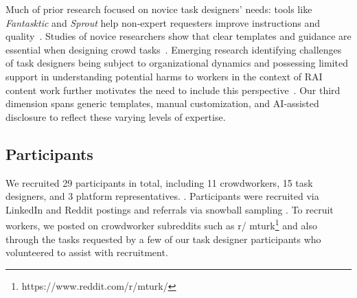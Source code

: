 Much of prior research focused on novice task designers’ needs: tools like \emph{Fantasktic} and \emph{Sprout} help non‑expert requesters improve instructions and quality~\cite{gutheim2012fantasktic,bragg2018sprout}. Studies of novice researchers show that clear templates and guidance are essential when designing crowd tasks~\cite{papoutsaki2015crowdsourcing}. Emerging research identifying challenges of task designers being subject to organizational dynamics and possessing limited support in understanding potential harms to workers in the context of RAI content work further motivates the need to include this perspective~\cite{qian2025locating}. Our third dimension spans generic templates, manual customization, and AI‑assisted disclosure to reflect these varying levels of expertise.  %


\subsection{Participants}
We recruited 29 participants in total, including 11 crowdworkers, 15 task designers, and 3 platform representatives. . Participants were recruited via LinkedIn and Reddit postings and referrals via snowball sampling \cite{parker2019snowball}. To recruit workers, we posted on crowdworker subreddits such as r\slash
mturk\footnote{https://www.reddit.com/r/mturk/} and also through the tasks requested by a few of our task designer participants who volunteered to assist with recruitment. 

